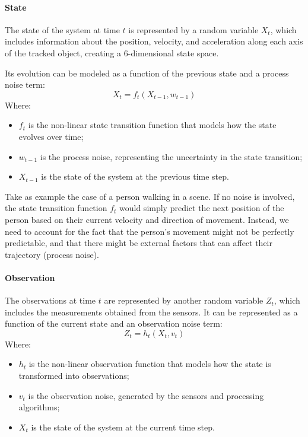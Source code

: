 \paragraph{State}
\label{bayesian-tracking:state}
The state of the system at time $t$ is represented by a random variable $X_t$, which includes information about the position, velocity, 
and acceleration along each axis of the tracked object, creating a 6-dimensional state space.

Its evolution can be modeled as a function of the previous state and a process noise term:
\begin{equation}
    X_t = f_t(X_{t-1}, w_{t-1})
    \label{eq:state-transition}
\end{equation}
Where:
\begin{itemize}
    \item $f_t$ is the non-linear state transition function that models how the state evolves over time;
    \item $w_{t-1}$ is the process noise, representing the uncertainty in the state transition;
    \item $X_{t-1}$ is the state of the system at the previous time step.
\end{itemize}
Take as example the case of a person walking in a scene. 
If no noise is involved, the state transition function $f_t$ would simply predict the next position of the person based on their current velocity and direction of movement. 
Instead, we need to account for the fact that the person's movement might not be perfectly predictable, and that there might be external factors that can affect their trajectory (process noise).

\paragraph{Observation}
\label{bayesian-tracking:observation}
The observations at time $t$ are represented by another random variable $Z_t$, which includes the measurements obtained from the sensors.
It can be represented as a function of the current state and an observation noise term:
\begin{equation}
    Z_t = h_t(X_t, v_t)
    \label{eq:observation}
\end{equation}
Where:
\begin{itemize}
    \item $h_t$ is the non-linear observation function that models how the state is transformed into observations;
    \item $v_t$ is the observation noise, generated by the sensors and processing algorithms;
    \item $X_t$ is the state of the system at the current time step.
\end{itemize}

